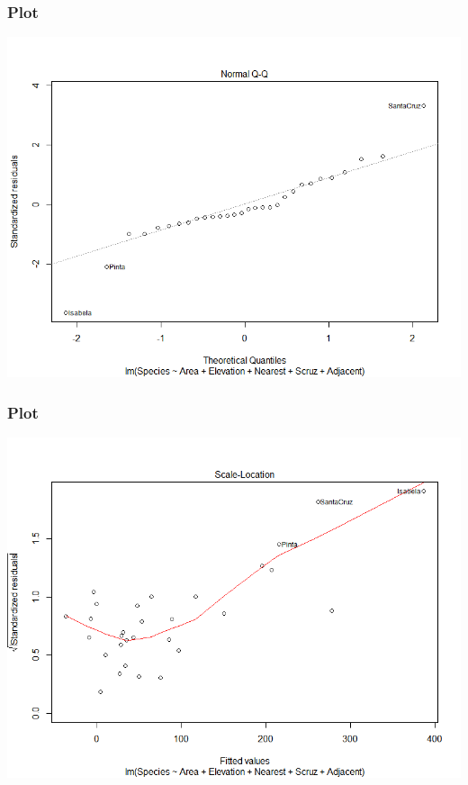 \documentclass{beamer}
\begin{document}
\begin{frame}
\frametitle{Plot}
\begin{center}
\includegraphics[width=1\textwidth,height=0.8\textheight]{lmplot2.png}
\end{center}
\end{frame}

\begin{frame}
\frametitle{Plot}
\begin{center}
\includegraphics[width=1\textwidth,height=0.8\textheight]{lmplot3.png}
\end{center}
\end{frame}
\end{document}
